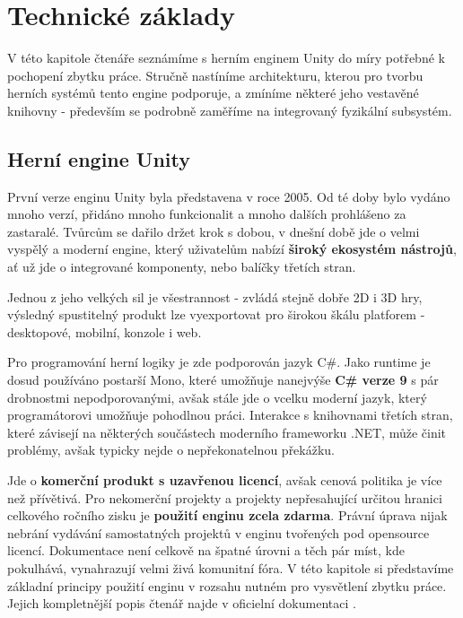\chapter{Technické základy} \label{technicalIntroChapter}

V této kapitole čtenáře seznámíme s herním enginem Unity \cite{Unity} do míry potřebné k pochopení zbytku práce. Stručně nastíníme architekturu, kterou pro tvorbu herních systémů tento engine podporuje, a zmíníme některé jeho vestavěné knihovny - především se podrobně zaměříme na integrovaný fyzikální subsystém.


\section{Herní engine Unity} \label{unityEngineIntroSection}

První verze enginu Unity byla představena v roce 2005. Od té doby bylo vydáno mnoho verzí, přidáno mnoho funkcionalit a mnoho dalších prohlášeno za zastaralé. Tvůrcům se dařilo držet krok s dobou, v dnešní době jde o velmi vyspělý a moderní engine, který uživatelům nabízí \textbf{široký ekosystém nástrojů}, ať už jde o integrované komponenty, nebo balíčky třetích stran. 

Jednou z jeho velkých sil je všestrannost - zvládá stejně dobře 2D i 3D hry, výsledný spustitelný produkt lze vyexportovat pro širokou škálu platforem - desktopové, mobilní, konzole i web.

Pro programování herní logiky je zde podporován jazyk C\#. Jako runtime je dosud používáno postarší Mono, které umožňuje nanejvýše \textbf{C\# verze 9} s pár drobnostmi nepodporovanými, avšak stále jde o vcelku moderní jazyk, který programátorovi umožňuje pohodlnou práci. Interakce s knihovnami třetích stran, které závisejí na některých součástech moderního frameworku .NET, může činit problémy, avšak typicky nejde o nepřekonatelnou překážku.

Jde o \textbf{komerční produkt s uzavřenou licencí}, avšak cenová politika je více než přívětivá. Pro nekomerční projekty a projekty nepřesahující určitou hranici celkového ročního zisku je \textbf{použití enginu zcela zdarma}. Právní úprava nijak nebrání vydávání samostatných projektů v enginu tvořených pod opensource licencí. Dokumentace není celkově na špatné úrovni a těch pár míst, kde pokulhává, vynahrazují velmi živá komunitní fóra.
\bigbreak
V této kapitole si představíme základní principy použití enginu v rozsahu nutném pro vysvětlení zbytku práce. Jejich kompletnější popis čtenář najde v oficielní dokumentaci \cite{Unity}. 


